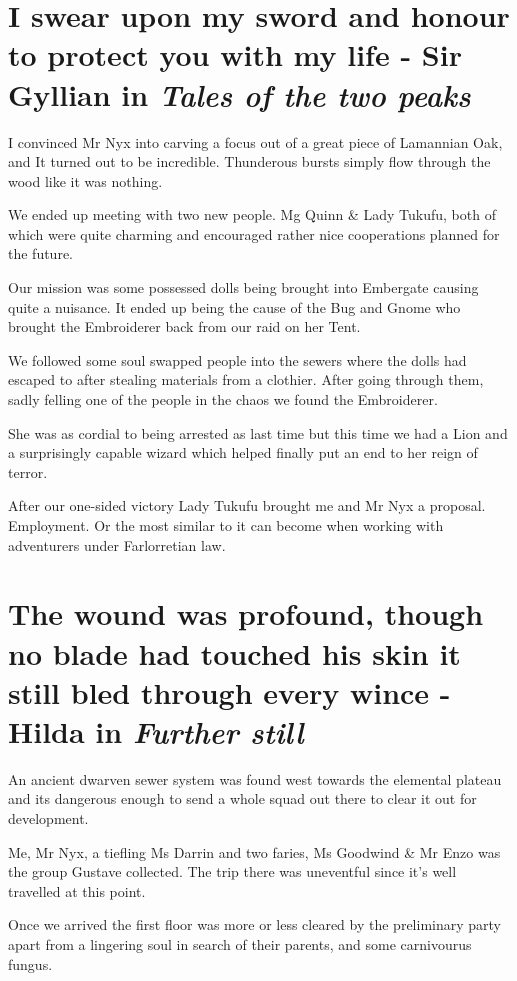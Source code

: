 \documentclass{article}
\begin{document}
\section*{I swear upon my sword and honour to protect you with my life - Sir Gyllian in \textit{Tales of the two peaks}}

I convinced Mr Nyx into carving a focus out of a great piece of Lamannian Oak, and It turned out to be incredible. Thunderous bursts simply flow through the wood like it was nothing. 

We ended up meeting with two new people. Mg Quinn \& Lady Tukufu, both of which were quite charming and encouraged rather nice cooperations planned for the future. 

Our mission was some possessed dolls being brought into Embergate causing quite a nuisance. It ended up being the cause of the Bug and Gnome who brought the Embroiderer back from our raid on her Tent.

We followed some soul swapped people into the sewers where the dolls had escaped to after stealing materials from a clothier. After going through them, sadly felling one of the people in the chaos we found the Embroiderer.

She was as cordial to being arrested as last time but this time we had a Lion and a surprisingly capable wizard which helped finally put an end to her reign of terror. 

After our one-sided victory Lady Tukufu brought me and Mr Nyx a proposal. Employment. Or the most similar to it can become when working with adventurers under Farlorretian law.

\section*{The wound was profound, though no blade had touched his skin it still bled through every wince - Hilda in \textit{Further still}}

An ancient dwarven sewer system was found west towards the elemental plateau and its dangerous enough to send a whole squad out there to clear it out for development. 

Me, Mr Nyx, a tiefling Ms Darrin and two faries, Ms Goodwind \& Mr Enzo was the group Gustave collected. The trip there was uneventful since it's well travelled at this point. 

Once we arrived the first floor was more or less cleared by the preliminary party apart from a lingering soul in search of their parents, and some carnivourus fungus. 
\end{document}
